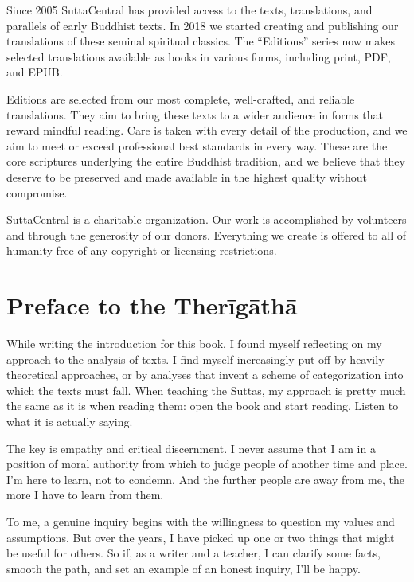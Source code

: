 \documentclass[12pt,openany]{book}%
\begin{document}
Since 2005 SuttaCentral has provided access to the texts, translations, and parallels of early Buddhist texts. In 2018 we started creating and publishing our translations of these seminal spiritual classics. The “Editions” series now makes selected translations available as books in various forms, including print, PDF, and EPUB.

Editions are selected from our most complete, well-crafted, and reliable translations. They aim to bring these texts to a wider audience in forms that reward mindful reading. Care is taken with every detail of the production, and we aim to meet or exceed professional best standards in every way. These are the core scriptures underlying the entire Buddhist tradition, and we believe that they deserve to be preserved and made available in the highest quality without compromise.

SuttaCentral is a charitable organization. Our work is accomplished by volunteers and through the generosity of our donors. Everything we create is offered to all of humanity free of any copyright or licensing restrictions. 

%
\chapter*{Preface to the \textsanskrit{Therīgāthā}}

While writing the introduction for this book, I found myself reflecting on my approach to the analysis of texts. I find myself increasingly put off by heavily theoretical approaches, or by analyses that invent a scheme of categorization into which the texts must fall. When teaching the Suttas, my approach is pretty much the same as it is when reading them: open the book and start reading. Listen to what it is actually saying.

The key is empathy and critical discernment. I never assume that I am in a position of moral authority from which to judge people of another time and place. I’m here to learn, not to condemn. And the further people are away from me, the more I have to learn from them.

To me, a genuine inquiry begins with the willingness to question my values and assumptions. But over the years, I have picked up one or two things that might be useful for others. So if, as a writer and a teacher, I can clarify some facts, smooth the path, and set an example of an honest inquiry, I’ll be happy.
\end{document}
